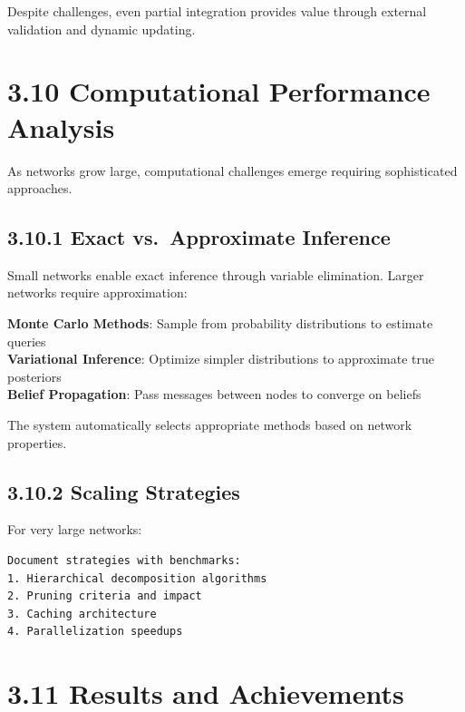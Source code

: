 \documentclass[
  11pt,
  letterpaper,
]{book}
\begin{document}
Despite challenges, even partial integration provides value through
external validation and dynamic updating.

\section*{3.10 Computational Performance
Analysis}\label{sec-computational-performance}


As networks grow large, computational challenges emerge requiring
sophisticated approaches.

\subsection*{3.10.1 Exact vs.~Approximate
Inference}\label{sec-exact-approximate}

Small networks enable exact inference through variable elimination.
Larger networks require approximation:

\textbf{Monte Carlo Methods}: Sample from probability distributions to
estimate queries\\
\textbf{Variational Inference}: Optimize simpler distributions to
approximate true posteriors\\
\textbf{Belief Propagation}: Pass messages between nodes to converge on
beliefs

The system automatically selects appropriate methods based on network
properties.

\subsection*{3.10.2 Scaling Strategies}\label{sec-scaling-strategies}

For very large networks:

\begin{verbatim}
Document strategies with benchmarks:
1. Hierarchical decomposition algorithms
2. Pruning criteria and impact
3. Caching architecture
4. Parallelization speedups
\end{verbatim}

\section*{3.11 Results and Achievements}\label{sec-results-achievements}
\end{document}
